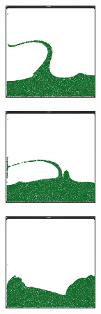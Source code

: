 \begin{figure}[ht!]
\begin{subfigure}[]{}
\includegraphics[height=35mm]{png/pcg9.png}
\end{subfigure}
\begin{subfigure}[]{}
\includegraphics[height=35mm]{png/pcg10.png}
\end{subfigure}
\begin{subfigure}[]{}
\includegraphics[height=35mm]{png/pcg11.png}
\end{subfigure}
\caption{}
\label{multigrid}
\end{figure}
